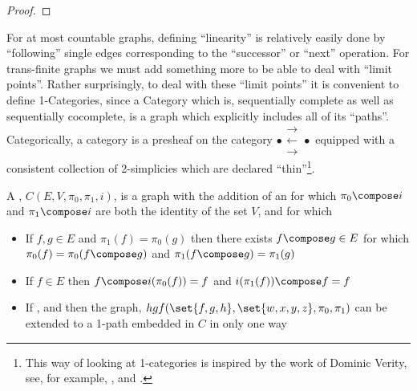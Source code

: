 \documentclass[a4paper]{amsart}
\begin{document}
\begin{proof}
\end{proof}

For at most countable graphs, defining ``linearity'' is relatively easily done by
``following'' single edges corresponding to the ``successor'' or ``next'' operation. For
trans-finite graphs we must add something more to be able to deal with ``limit points''.
Rather surprisingly, to deal with these ``limit points'' it is convenient to define
1-Categories, since a Category which is, sequentially complete as well as sequentially
cocomplete, is a graph which explicitly includes all of its ``paths''. Categorically, a
category is a presheaf on the category
$ \bullet \substack{\mathbf{\longrightarrow} \\[-0.7ex] \mathbf{\longleftarrow} 
\\[-0.7ex] \mathbf{\longrightarrow} } \bullet $
equipped with a consistent collection of 2-simplicies which are declared
``thin''\footnote{This way of looking at 1-categories is inspired by the work of Dominic
Verity, see, for example, \cite{verity2005complicialSets},
\cite{verity2006complicialSimplicialHomotopy} and
\cite{verity2006simplicialComplicialCategories}.}.

\begin{definition}

A , $C(E, V, \pi_0, \pi_1, i)$, is a graph with the addition of an 
  for which $\pi_0 \compose i$ and $\pi_1 
\compose i$ are both the identity of the set $V$, and for which 

\begin{itemize}

\item If $f, g \in E$ and $\pi_1(f) = \pi_0(g)$ then there exists $f \compose g \in E$ for 
which $ \pi_0(f) = \pi_0(f \compose g)$ and $ \pi_1(f \compose g) = \pi_1(g)$

\item If $f \in E$ then $ f \compose i(\pi_0(f)) = f$ and $i(\pi_1(f)) \compose f = f$

\item If ,  and  then the graph, $hgf(\set{f,
g, h}, \set{w, x, y, z}, \pi_0, \pi_1)$ can be extended to a 1-path embedded in $C$ in only 
one way

\end{itemize}

\end{definition}
\end{document}

